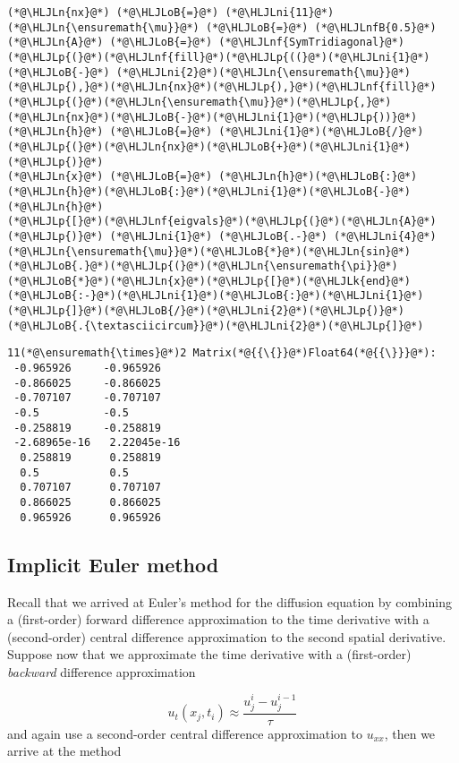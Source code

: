 \documentclass[12pt,landscape]{article}
\newcommand{\HLJLk}[1]{\textcolor[RGB]{148,91,176}{\textbf{#1}}}
\newcommand{\HLJLn}[1]{#1}
\newcommand{\HLJLnf}[1]{\textcolor[RGB]{66,102,213}{#1}}
\newcommand{\HLJLnfB}[1]{\textcolor[RGB]{59,151,46}{#1}}
\newcommand{\HLJLni}[1]{\textcolor[RGB]{59,151,46}{#1}}
\newcommand{\HLJLoB}[1]{\textcolor[RGB]{102,102,102}{\textbf{#1}}}
\newcommand{\HLJLp}[1]{#1}
\begin{document}
{\begin{lstlisting}
(*@\HLJLn{nx}@*) (*@\HLJLoB{=}@*) (*@\HLJLni{11}@*)
(*@\HLJLn{\ensuremath{\mu}}@*) (*@\HLJLoB{=}@*) (*@\HLJLnfB{0.5}@*)
(*@\HLJLn{A}@*) (*@\HLJLoB{=}@*) (*@\HLJLnf{SymTridiagonal}@*)(*@\HLJLp{(}@*)(*@\HLJLnf{fill}@*)(*@\HLJLp{((}@*)(*@\HLJLni{1}@*) (*@\HLJLoB{-}@*) (*@\HLJLni{2}@*)(*@\HLJLn{\ensuremath{\mu}}@*)(*@\HLJLp{),}@*)(*@\HLJLn{nx}@*)(*@\HLJLp{),}@*)(*@\HLJLnf{fill}@*)(*@\HLJLp{(}@*)(*@\HLJLn{\ensuremath{\mu}}@*)(*@\HLJLp{,}@*)(*@\HLJLn{nx}@*)(*@\HLJLoB{-}@*)(*@\HLJLni{1}@*)(*@\HLJLp{))}@*)
(*@\HLJLn{h}@*) (*@\HLJLoB{=}@*) (*@\HLJLni{1}@*)(*@\HLJLoB{/}@*)(*@\HLJLp{(}@*)(*@\HLJLn{nx}@*)(*@\HLJLoB{+}@*)(*@\HLJLni{1}@*)(*@\HLJLp{)}@*)
(*@\HLJLn{x}@*) (*@\HLJLoB{=}@*) (*@\HLJLn{h}@*)(*@\HLJLoB{:}@*)(*@\HLJLn{h}@*)(*@\HLJLoB{:}@*)(*@\HLJLni{1}@*)(*@\HLJLoB{-}@*)(*@\HLJLn{h}@*)
(*@\HLJLp{[}@*)(*@\HLJLnf{eigvals}@*)(*@\HLJLp{(}@*)(*@\HLJLn{A}@*)(*@\HLJLp{)}@*) (*@\HLJLni{1}@*) (*@\HLJLoB{.-}@*) (*@\HLJLni{4}@*)(*@\HLJLn{\ensuremath{\mu}}@*)(*@\HLJLoB{*}@*)(*@\HLJLn{sin}@*)(*@\HLJLoB{.}@*)(*@\HLJLp{(}@*)(*@\HLJLn{\ensuremath{\pi}}@*)(*@\HLJLoB{*}@*)(*@\HLJLn{x}@*)(*@\HLJLp{[}@*)(*@\HLJLk{end}@*)(*@\HLJLoB{:-}@*)(*@\HLJLni{1}@*)(*@\HLJLoB{:}@*)(*@\HLJLni{1}@*)(*@\HLJLp{]}@*)(*@\HLJLoB{/}@*)(*@\HLJLni{2}@*)(*@\HLJLp{)}@*)(*@\HLJLoB{.{\textasciicircum}}@*)(*@\HLJLni{2}@*)(*@\HLJLp{]}@*)
\end{lstlisting}

\begin{lstlisting}
11(*@\ensuremath{\times}@*)2 Matrix(*@{{\{}}@*)Float64(*@{{\}}}@*):
 -0.965926     -0.965926
 -0.866025     -0.866025
 -0.707107     -0.707107
 -0.5          -0.5
 -0.258819     -0.258819
 -2.68965e-16   2.22045e-16
  0.258819      0.258819
  0.5           0.5
  0.707107      0.707107
  0.866025      0.866025
  0.965926      0.965926
\end{lstlisting}


\subsection{Implicit Euler method}
Recall that we arrived at Euler's method for the diffusion equation by combining a (first-order) forward difference approximation to the time derivative with a (second-order) central difference approximation to the second spatial derivative.  Suppose now that we approximate the time derivative with a (first-order) \emph{backward} difference approximation 

\[
u_t(x_j,t_i) \approx \frac{u^{i}_j - u^{i-1}_j}{\tau}
\]
and again use a second-order central difference approximation to $u_{xx}$, then we arrive at the method

}
\end{document}
